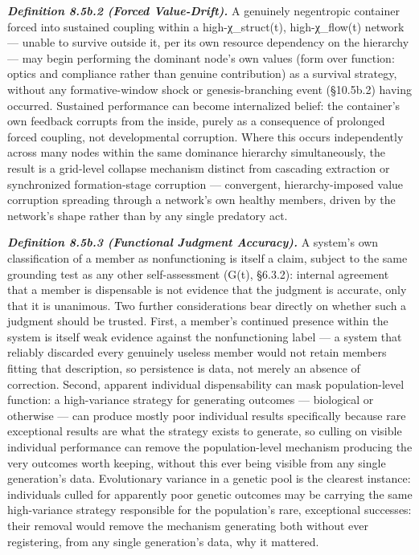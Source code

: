 \documentclass[
]{article}
\begin{document}
\emph{\textbf{Definition 8.5b.2 (Forced Value-Drift).}} A genuinely
negentropic container forced into sustained coupling within a
high-χ\_struct(t), high-χ\_flow(t) network --- unable to survive outside
it, per its own resource dependency on the hierarchy --- may begin
performing the dominant node's own values (form over function: optics
and compliance rather than genuine contribution) as a survival strategy,
without any formative-window shock or genesis-branching event (§10.5b.2)
having occurred. Sustained performance can become internalized belief:
the container's own feedback corrupts from the inside, purely as a
consequence of prolonged forced coupling, not developmental corruption.
Where this occurs independently across many nodes within the same
dominance hierarchy simultaneously, the result is a grid-level collapse
mechanism distinct from cascading extraction or synchronized
formation-stage corruption --- convergent, hierarchy-imposed value
corruption spreading through a network's own healthy members, driven by
the network's shape rather than by any single predatory act.

\emph{\textbf{Definition 8.5b.3 (Functional Judgment Accuracy).}} A
system's own classification of a member as nonfunctioning is itself a
claim, subject to the same grounding test as any other self-assessment
(G(t), §6.3.2): internal agreement that a member is dispensable is not
evidence that the judgment is accurate, only that it is unanimous. Two
further considerations bear directly on whether such a judgment should
be trusted. First, a member's continued presence within the system is
itself weak evidence against the nonfunctioning label --- a system that
reliably discarded every genuinely useless member would not retain
members fitting that description, so persistence is data, not merely an
absence of correction. Second, apparent individual dispensability can
mask population-level function: a high-variance strategy for generating
outcomes --- biological or otherwise --- can produce mostly poor
individual results specifically because rare exceptional results are
what the strategy exists to generate, so culling on visible individual
performance can remove the population-level mechanism producing the very
outcomes worth keeping, without this ever being visible from any single
generation's data. Evolutionary variance in a genetic pool is the
clearest instance: individuals culled for apparently poor genetic
outcomes may be carrying the same high-variance strategy responsible for
the population's rare, exceptional successes: their removal would remove
the mechanism generating both without ever registering, from any single
generation's data, why it mattered.
\end{document}
